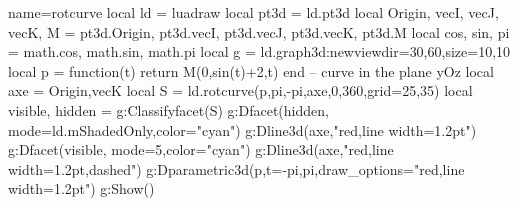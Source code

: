 \begin{luadraw}{name=rotcurve}
local ld = luadraw
local pt3d = ld.pt3d
local Origin, vecI, vecJ, vecK, M = pt3d.Origin, pt3d.vecI, pt3d.vecJ, pt3d.vecK, pt3d.M
local cos, sin, pi = math.cos, math.sin, math.pi
local g = ld.graph3d:new{viewdir={30,60},size={10,10}}
local p = function(t) return M(0,sin(t)+2,t) end -- curve in the plane yOz
local axe = {Origin,vecK}
local S = ld.rotcurve(p,pi,-pi,axe,0,360,{grid={25,35}})
local visible, hidden = g:Classifyfacet(S)
g:Dfacet(hidden, {mode=ld.mShadedOnly,color="cyan"})
g:Dline3d(axe,"red,line width=1.2pt")
g:Dfacet(visible, {mode=5,color="cyan"})
g:Dline3d(axe,"red,line width=1.2pt,dashed")
g:Dparametric3d(p,{t={-pi,pi},draw_options="red,line width=1.2pt"})
g:Show()
\end{luadraw}
